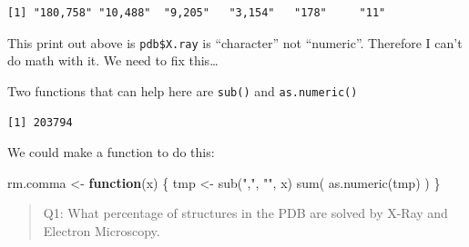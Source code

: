 \documentclass[
  letterpaper,
  DIV=11,
  numbers=noendperiod]{scrartcl}
\newenvironment{Shaded}{\begin{snugshade}}{\end{snugshade}}
\newcommand{\CommentTok}[1]{\textcolor[rgb]{0.37,0.37,0.37}{#1}}
\newcommand{\ControlFlowTok}[1]{\textcolor[rgb]{0.00,0.23,0.31}{\textbf{#1}}}
\newcommand{\DecValTok}[1]{\textcolor[rgb]{0.68,0.00,0.00}{#1}}
\newcommand{\FunctionTok}[1]{\textcolor[rgb]{0.28,0.35,0.67}{#1}}
\newcommand{\NormalTok}[1]{\textcolor[rgb]{0.00,0.23,0.31}{#1}}
\newcommand{\OtherTok}[1]{\textcolor[rgb]{0.00,0.23,0.31}{#1}}
\newcommand{\SpecialCharTok}[1]{\textcolor[rgb]{0.37,0.37,0.37}{#1}}
\newcommand{\StringTok}[1]{\textcolor[rgb]{0.13,0.47,0.30}{#1}}
\begin{document}
\begin{verbatim}
[1] "180,758" "10,488"  "9,205"   "3,154"   "178"     "11"     
\end{verbatim}

This print out above is \texttt{pdb\$X.ray} is ``character'' not
``numeric''. Therefore I can't do math with it. We need to fix
this\ldots{}

Two functions that can help here are \texttt{sub()} and
\texttt{as.numeric()}

\begin{Shaded}
\end{Shaded}

\begin{verbatim}
[1] 203794
\end{verbatim}

We could make a function to do this:

\begin{Shaded}
\begin{Highlighting}[]
\NormalTok{rm.comma }\OtherTok{\textless{}{-}} \ControlFlowTok{function}\NormalTok{(x) \{}
\NormalTok{  tmp }\OtherTok{\textless{}{-}} \FunctionTok{sub}\NormalTok{(}\StringTok{","}\NormalTok{, }\StringTok{""}\NormalTok{, x)}
\FunctionTok{sum}\NormalTok{( }\FunctionTok{as.numeric}\NormalTok{(tmp) )}
\NormalTok{\}}
\end{Highlighting}
\end{Shaded}

\begin{quote}
Q1: What percentage of structures in the PDB are solved by X-Ray and
Electron Microscopy.
\end{quote}

\begin{Shaded}
\end{Shaded}
\end{document}
